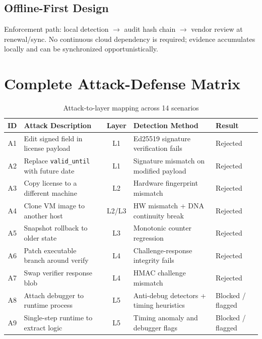 \documentclass[11pt,a4paper]{article}
\begin{document}
\subsection{Offline-First Design}
Enforcement path: local detection $\rightarrow$ audit hash chain $\rightarrow$ vendor review at renewal/sync. No continuous cloud dependency is required; evidence accumulates locally and can be synchronized opportunistically.

\section{Complete Attack-Defense Matrix}

\begin{table}[H]
\centering
\caption{Attack-to-layer mapping across 14 scenarios}
\small
\begin{tabularx}{\textwidth}{c Y c Y Y}
\toprule
\textbf{ID} & \textbf{Attack Description} & \textbf{Layer} & \textbf{Detection Method} & \textbf{Result} \\
\midrule
{}
A1 & Edit signed field in license payload & L1 & Ed25519 signature verification fails & Rejected \\
A2 & Replace \texttt{valid\_until} with future date & L1 & Signature mismatch on modified payload & Rejected \\
A3 & Copy license to a different machine & L2 & Hardware fingerprint mismatch & Rejected \\
A4 & Clone VM image to another host & L2/L3 & HW mismatch + DNA continuity break & Rejected \\
A5 & Snapshot rollback to older state & L3 & Monotonic counter regression & Rejected \\
A6 & Patch executable branch around verify & L4 & Challenge-response integrity fails & Rejected \\
A7 & Swap verifier response blob & L4 & HMAC challenge mismatch & Rejected \\
A8 & Attach debugger to runtime process & L5 & Anti-debug detectors + timing heuristics & Blocked / flagged \\
A9 & Single-step runtime to extract logic & L5 & Timing anomaly and debugger flags & Blocked / flagged \\

\end{tabularx}
\end{table}
\end{document}
